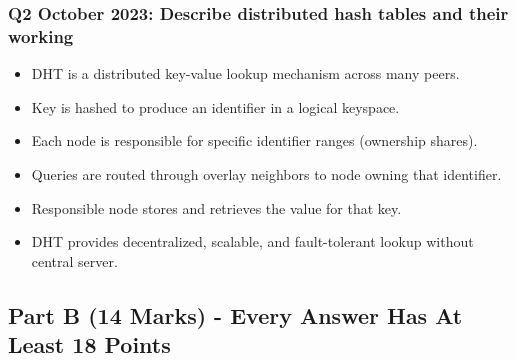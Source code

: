 \documentclass[12pt,a4paper]{article}
\begin{document}
\subsubsection*{Q2 October 2023: Describe distributed hash tables and their working}
\begin{itemize}
\item DHT is a distributed key-value lookup mechanism across many peers.
\item Key is hashed to produce an identifier in a logical keyspace.
\item Each node is responsible for specific identifier ranges (ownership shares).
\item Queries are routed through overlay neighbors to node owning that identifier.
\item Responsible node stores and retrieves the value for that key.
\item DHT provides decentralized, scalable, and fault-tolerant lookup without central server.
\end{itemize}

\subsection*{Part B (14 Marks) - Every Answer Has At Least 18 Points}
\end{document}
